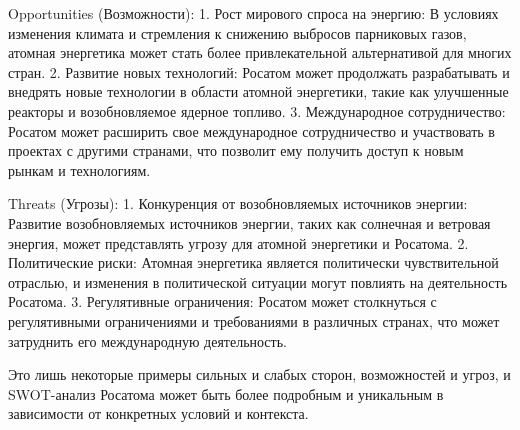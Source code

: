 Opportunities (Возможности):
1. Рост мирового спроса на энергию: В условиях изменения климата и стремления к снижению выбросов парниковых газов, атомная энергетика может стать более привлекательной альтернативой для многих стран.
2. Развитие новых технологий: Росатом может продолжать разрабатывать и внедрять новые технологии в области атомной энергетики, такие как улучшенные реакторы и возобновляемое ядерное топливо.
3. Международное сотрудничество: Росатом может расширить свое международное сотрудничество и участвовать в проектах с другими странами, что позволит ему получить доступ к новым рынкам и технологиям.

Threats (Угрозы):
1. Конкуренция от возобновляемых источников энергии: Развитие возобновляемых источников энергии, таких как солнечная и ветровая энергия, может представлять угрозу для атомной энергетики и Росатома.
2. Политические риски: Атомная энергетика является политически чувствительной отраслью, и изменения в политической ситуации могут повлиять на деятельность Росатома.
3. Регулятивные ограничения: Росатом может столкнуться с регулятивными ограничениями и требованиями в различных странах, что может затруднить его международную деятельность.

Это лишь некоторые примеры сильных и слабых сторон, возможностей и угроз, и SWOT-анализ Росатома может быть более подробным и уникальным в зависимости от конкретных условий и контекста.

